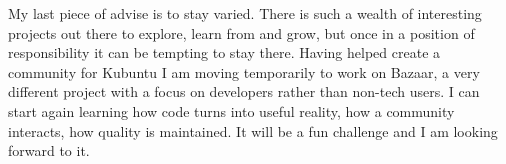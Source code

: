 My last piece of advise is to stay varied. There is such a wealth of interesting projects out there to explore, learn from and grow, but once in a position of responsibility it can be tempting to stay there. Having helped create a community for Kubuntu I am moving temporarily to work on Bazaar, a very different project with a focus on developers rather than non-tech users. I can start again learning how code turns into useful reality, how a community interacts, how quality is maintained. It will be a fun challenge and I am looking forward to it.
